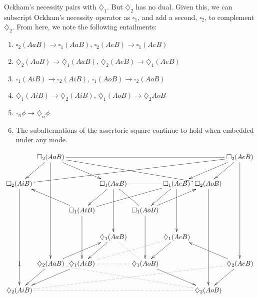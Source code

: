 \documentclass{beamer}
\begin{document}
\begin{frame}
Ockham's necessity pairs with $\diamondsuit_{1}$. But $\diamondsuit_{2}$ has no dual. Given this, we can subscript Ockham's necessity operator as $\square_{1}$, and add a second, $\square_{2}$, to complement $\diamondsuit_{2}$. From here, we note the following entailments:
	\begin{enumerate}
		\item $\square_{2}(AaB) \rightarrow \square_{1}(AaB)$, $\square_{2}(AeB) \rightarrow \square_{1}(AeB)$
		\item $\diamondsuit_{2}(AaB) \rightarrow \diamondsuit_{1}(AaB)$, $\diamondsuit_{2}(AeB) \rightarrow \diamondsuit_{1}(AeB)$
		\item $\square_{1}(AiB) \rightarrow \square_{2}(AiB)$, $\square_{1}(AoB) \rightarrow \square_{2}(AoB)$
		\item $\diamondsuit_{1}(AiB) \rightarrow \diamondsuit_{2}(AiB)$, $\diamondsuit_{1}(AoB) \rightarrow \diamondsuit_{2}AoB$ 
		\item $\square_{n}\phi \rightarrow \diamondsuit_{n}\phi$
		\item The subalternations of the assertoric square continue to hold when embedded under any mode. 
	\end{enumerate}
\end{frame}
\begin{frame} \tiny
	\begin{displaymath} 
	\xymatrix@C=.1em{
		& \square_{2}(AaB) \ar[dddd] \ar[drr] \ar [dl] \ar@{-}[rrrrrr] \ar@{-}[drrrrr] &  &  &  &  &  & \square_{2}(AeB) \ar[dddd] \ar[dl] \ar[dll]\\
		\square_{2}(AiB) \ar[dddd] \ar@{-}[urrrrrrr] &  &  & \square_{1}(AaB) \ar[dd] \ar[dl] \ar@{-}[rr] \ar@{-}[dr]
		&  & \square_{1}(AeB) \ar[dd] \ar[dl] \ar@{-}[dlll] & \square_{2}(AoB) \ar[dddd] &  \\
		&  & \square_{1}(AiB) \ar[dd] \ar[ull] &  & \square_{1}(AoB) \ar[dd] \ar[urr] &  &  &  \\
		&  &  & \diamondsuit_{1}(AaB) \ar[dl] \ar@{.}[dr] &  & \diamondsuit_{1}(AeB) \ar[dl] &  &  \\ 
		1 & \diamondsuit_{2}(AaB) \ar[dl] \ar[urr] \ar@{.}[drrrrr] & \diamondsuit_{1}(AiB) \ar[dll] \ar@{.}[rr] \ar@{.}[rrru]& & \diamondsuit_{1}(AoB) \ar[drr] &  &  & \diamondsuit_{2}(AeB) \ar[ull] \ar[dl] \\
		\diamondsuit_{2}(AiB) \ar@{.}[rrrrrr] \ar@{.}[rrrrrrru] &  &  &  &  &  & \diamondsuit_{2}(AoB) & }
	\end{displaymath}
\end{frame}
\end{document}
